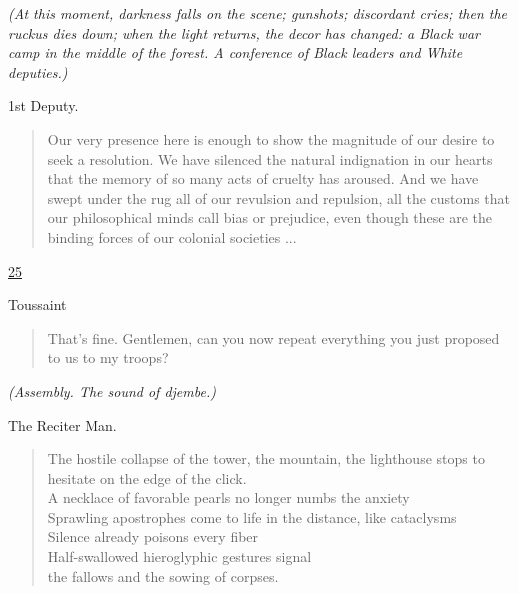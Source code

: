 \documentclass[letterpaper,article,12pt,oneside,notitlepage]{memoir}
\begin{document}
\textit{(At this moment, darkness falls on the scene; gunshots; discordant cries; then the ruckus dies down; when the light returns, the decor has changed: a Black war camp in the middle of the forest. A conference of Black leaders and White deputies.)}

\begin{center}1st Deputy.\end{center}

\begin{verse}
\indent Our very presence here is enough to show the magnitude of our desire to seek a resolution. We have silenced the natural indignation in our hearts that the memory of so many acts of cruelty has aroused. And we have swept under the rug all of our revulsion and repulsion, all the customs that our philosophical minds call bias or prejudice, even though these are the binding forces of our colonial societies ... \\
\end{verse}

\clearpage

\href{http://cesaire.elotroalex.com/chiens/chiens/p025.html}{25}

\begin{center}Toussaint\end{center}

\begin{verse}
\indent That's fine. Gentlemen, can you now repeat everything you just proposed to us to my troops? \\
\end{verse}

\textit{(Assembly. The sound of djembe.)}

\begin{center}The Reciter Man.\end{center}

\begin{verse}
The hostile collapse of the tower, the mountain, the lighthouse stops to hesitate on the edge of the click. \\
A necklace of favorable pearls no longer numbs the anxiety \\
Sprawling apostrophes come to life in the distance, like cataclysms \\
Silence already poisons every fiber \\
Half-swallowed hieroglyphic gestures signal \\
the fallows and the sowing of corpses. \\
\end{verse}
\end{document}
